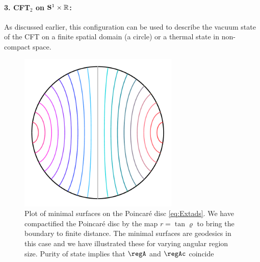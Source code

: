 \documentclass[12pt,openany]{book}
\begin{document}
\paragraph{3. CFT$_2$ on ${\bf S}^1 \times {\mathbb R}$:} As discussed earlier,  this configuration can be used to describe the vacuum state of the CFT on a finite spatial domain (a circle) or a thermal state in non-compact space.

\begin{figure}[htbp]
\begin{center}
\includegraphics[width=3in]{figures/EA-ads3}
\end{center}
\caption{Plot of minimal surfaces on the Poincar\'e disc \eqref{eq:Extads}. We have compactified the Poincar\'e disc by the map $r = \tan\varrho$ to bring the boundary to finite distance. The minimal surfaces are geodesics in this case and we have illustrated these for varying angular region size. Purity of state implies that $\regA$ and $\regAc$ coincide}
\label{f:EAads3}
\end{figure}
%
\end{document}
